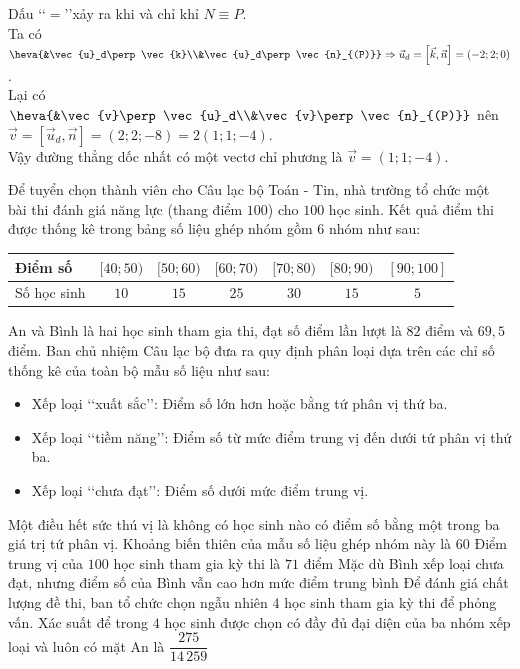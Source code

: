 \begin{ex}
{\begin{itemchoice}
			Dấu \lq\lq$=$\rq\rq xảy ra khi và chỉ khỉ $N \equiv P$.\\
			Ta có $\heva{&\vec{u}_d\perp \vec{k}\\&\vec{u}_d\perp \vec{n}_{(P)}}\Rightarrow \vec{u}_d = \left[\vec{k}, \vec{n}\right]=(-2;2;0)$.\\
			Lại có $\heva{&\vec{v}\perp \vec{u}_d\\&\vec{v}\perp \vec{n}_{(P)}}$ nên
			$\vec{v} = \left[\vec{u}_d, \vec{n}\right]=(2;2;-8)=2(1;1;-4)$.\\
			Vậy đường thẳng dốc nhất có một vectơ chỉ phương là $\vec{v}=(1;1;-4)$.	
		\end{itemchoice}
	}
\end{ex}

\begin{ex}%
	Để tuyển chọn thành viên cho Câu lạc bộ Toán - Tin, nhà trường tổ chức một bài thi đánh giá năng lực (thang điểm $100$) cho $100$ học sinh. Kết quả điểm thi được thống kê trong bảng số liệu ghép nhóm gồm $6$ nhóm như sau:
	\begin{center}
		\begin{tabular}{|l|c|c|c|c|c|c|}
			\hline
			Điểm số & $[40; 50)$ & $[50; 60)$ & $[60; 70)$ & $[70; 80)$ & $[80; 90)$ & $[90; 100]$ \\
			\hline
			Số học sinh & $10$ & $15$ & $25$ & $30$ & $15$ & $5$ \\ 
			\hline
		\end{tabular}
	\end{center}
	An và Bình là hai học sinh tham gia thi, đạt số điểm lần lượt là $82$ điểm và $69{,}5$ điểm. Ban chủ nhiệm Câu lạc bộ đưa ra quy định phân loại dựa trên các chỉ số thống kê của toàn bộ mẫu số liệu như sau:
	\begin{itemize}
		\item Xếp loại \lq\lq xuất sắc\rq\rq: Điểm số lớn hơn hoặc bằng tứ phân vị thứ ba.
		\item Xếp loại \lq\lq tiềm năng\rq\rq: Điểm số từ mức điểm trung vị đến dưới tứ phân vị thứ ba.
		\item Xếp loại \lq\lq chưa đạt\rq\rq: Điểm số dưới mức điểm trung vị.
	\end{itemize}
	Một điều hết sức thú vị là không có học sinh nào có điểm số bằng một trong ba giá trị tứ phân vị.
	\choiceTF
		{\True Khoảng biến thiên của mẫu số liệu ghép nhóm này là $60$}
		{Điểm trung vị của $100$ học sinh tham gia kỳ thi là $71$ điểm}
		{\True Mặc dù Bình xếp loại chưa đạt, nhưng điểm số của Bình vẫn cao hơn mức điểm trung bình}
		{\True Để đánh giá chất lượng đề thi, ban tổ chức chọn ngẫu nhiên $4$ học sinh tham gia kỳ thi để phỏng vấn. Xác suất để trong $4$ học sinh được chọn có đầy đủ đại diện của ba nhóm xếp loại và luôn có mặt An là  $\dfrac{275}{14\,259}$}

\end{ex}
